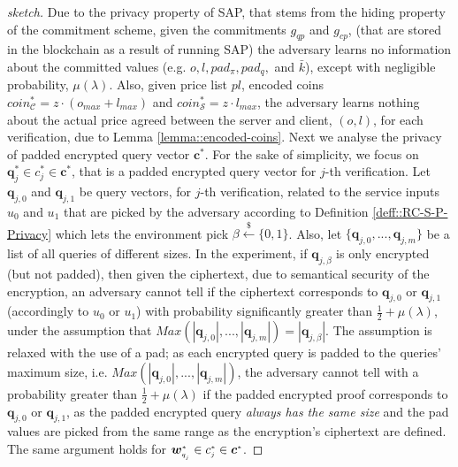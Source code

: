 \begin{proof}[sketch]
Due to the privacy property of SAP, that stems from the  hiding property of the commitment scheme, given the commitments $g_{\scriptscriptstyle qp}$ and $g_{\scriptscriptstyle cp}$, (that are stored in the blockchain as a result of running SAP) the adversary learns no information about the committed values (e.g. $o, l, pad_{\scriptscriptstyle\pi}, pad_{\scriptscriptstyle q},$ and $\bar{k}$), except with negligible probability, $\mu(\lambda)$.   Also, given  price list $pl$, encoded coins $coin^{\scriptscriptstyle *}_{\scriptscriptstyle\mathcal{C}}=z\cdot (o_{\scriptscriptstyle max}+l_{\scriptscriptstyle max})$ and  $coin^{\scriptscriptstyle *}_{\scriptscriptstyle\mathcal{S}}=z\cdot l_{\scriptscriptstyle max}$, the adversary learns nothing about the actual price agreed between the server and client,  $(o,l)$, for each verification, due to Lemma \ref{lemma::encoded-coins}. Next we analyse the privacy of padded encrypted query vector $\bm{c}^{\scriptscriptstyle *}$. For  the sake of simplicity, we focus on   $\bm{q}^{\scriptscriptstyle *}_{\scriptscriptstyle j}\in c^{\scriptscriptstyle *}_{\scriptscriptstyle j}\in\bm{c}^{\scriptscriptstyle *}$, that is a padded encrypted query vector for $j$-th verification. Let $\bm{q}_{\scriptscriptstyle j,0}$ and $\bm{q}_{\scriptscriptstyle j,1}$  be query vectors, for $j$-th verification, related to the service inputs $u_{\scriptscriptstyle 0}$ and $u_{\scriptscriptstyle 1}$ that    are picked by the adversary according to  Definition  \ref{deff::RC-S-P-Privacy} which lets  the environment pick $\beta\stackrel{\scriptscriptstyle\$}\leftarrow \{0,1\}$. Also, let $\{\bm{q}_{\scriptscriptstyle j,0},...,\bm{q}_{\scriptscriptstyle j,m}\}$ be a  list of all queries of different sizes. In the experiment, if $\bm{q}_{\scriptscriptstyle j,\beta}$  is only   encrypted (but not padded), then given the ciphertext, due to semantical security of the encryption, an adversary cannot tell if the ciphertext corresponds to $\bm{q}_{\scriptscriptstyle j,0}$ or $\bm{q}_{\scriptscriptstyle j,1}$  (accordingly to $u_{\scriptscriptstyle 0}$ or $u_{\scriptscriptstyle 1}$) with probability significantly greater than $\frac{1}{2}+\mu(\lambda)$,  under the assumption  that $Max(|\bm{q}_{\scriptscriptstyle j,0}|,...,|\bm{q}_{\scriptscriptstyle j,m}|)=|\bm{q}_{\scriptscriptstyle j,\beta}|$. The  assumption is  relaxed with the use of a pad; as each encrypted query is padded  to the queries' maximum size, i.e. $Max(|\bm{q}_{\scriptscriptstyle j,0}|,...,|\bm{q}_{\scriptscriptstyle j,m}|)$, the adversary cannot tell with a probability greater than $\frac{1}{2}+\mu(\lambda)$ if the  padded encrypted proof corresponds to  $\bm{q}_{\scriptscriptstyle j,0}$ or $\bm{q}_{\scriptscriptstyle j,1}$, as the padded encrypted query \emph{always has the same size} and the pad values are picked from the same range as the encryption's ciphertext are defined. The same argument holds for $\bm{w}^{\scriptscriptstyle *}_{\scriptscriptstyle q_{_{\scaleto{j}{\size}}}}\in c^{\scriptscriptstyle *}_{\scriptscriptstyle j}\in\bm{c}^{\scriptscriptstyle *}$. 


\end{proof}
